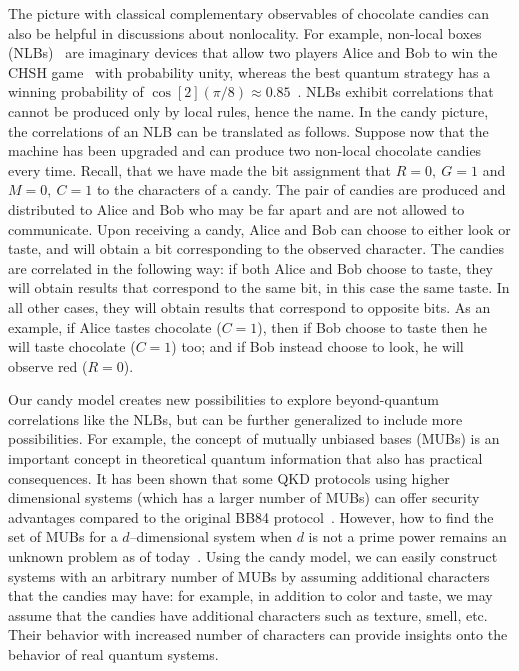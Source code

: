 \documentclass{article}
\begin{document}
The picture with classical complementary observables of chocolate candies can also be helpful in discussions about nonlocality.
For example, non-local boxes (NLBs)~\cite{popescu1994quantum} are imaginary devices that allow two players Alice and Bob to win the CHSH game~\cite{buhrman2001quantum} with probability unity, whereas the best quantum strategy has a winning probability of $\cos[2](\pi/8) \approx 0.85$~\cite{broadbent2006power}.
NLBs exhibit correlations that cannot be produced only by local rules, hence the name.
In the candy picture, the correlations of an NLB can be translated as follows.
Suppose now that the machine has been upgraded and can produce two non-local chocolate candies every time.
Recall, that we have made the bit assignment that $R = 0,\ G = 1$ and $M = 0,\ C = 1$ to the characters of a candy.
The pair of candies are produced and distributed to Alice and Bob who may be far apart and are not allowed to communicate.
Upon receiving a candy, Alice and Bob can choose to either look or taste, and will obtain a bit corresponding to the observed character.
The candies are correlated in the following way: if both Alice and Bob choose to taste, they will obtain results that correspond to the same bit, in this case the same taste.
In all other cases, they will obtain results that correspond to opposite bits.
As an example, if Alice tastes chocolate ($C = 1$), then if Bob choose to taste then he will taste chocolate ($C = 1$) too; and if Bob instead choose to look, he will observe red ($R = 0$).

Our candy model creates new possibilities to explore beyond-quantum correlations like the NLBs, but can be further generalized to include more possibilities. 
For example, the concept of mutually unbiased bases (MUBs) is an important concept in theoretical quantum information that also has practical consequences.
It has been shown that some QKD protocols using higher dimensional systems (which has a larger number of MUBs) can offer security advantages compared to the original BB84 protocol~\cite{cerf2002security}.
However, how to find the set of MUBs for a $d$--dimensional system when $d$ is not a prime power remains an unknown problem as of today~\cite{coles2017entropic}.
Using the candy model, we can easily construct systems with an arbitrary number of MUBs by assuming additional characters that the candies may have: for example, in addition to color and taste, we may assume that the candies have additional characters such as texture, smell, etc.
Their behavior with increased number of characters can provide insights onto the behavior of real quantum systems.







\end{document}
